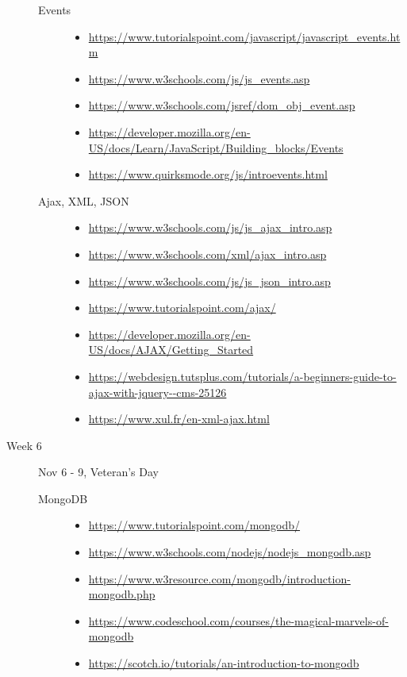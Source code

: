 \documentclass{article}
\begin{document}
\begin{description}
\begin{description}
\item[Events]\mbox{}
  \begin{itemize}
  \item\scriptsize\url{https://www.tutorialspoint.com/javascript/javascript_events.htm}
  \item\scriptsize\url{https://www.w3schools.com/js/js_events.asp}
  \item\scriptsize\url{https://www.w3schools.com/jsref/dom_obj_event.asp}
  \item\scriptsize\url{https://developer.mozilla.org/en-US/docs/Learn/JavaScript/Building_blocks/Events}
  \item\scriptsize\url{https://www.quirksmode.org/js/introevents.html}
  \end{itemize}    

\item[Ajax, XML, JSON]\mbox{}
  \begin{itemize}
  \item\scriptsize\url{https://www.w3schools.com/js/js_ajax_intro.asp}
  \item\scriptsize\url{https://www.w3schools.com/xml/ajax_intro.asp}
  \item\scriptsize\url{https://www.w3schools.com/js/js_json_intro.asp}
  \item\scriptsize\url{https://www.tutorialspoint.com/ajax/}
  \item\scriptsize\url{https://developer.mozilla.org/en-US/docs/AJAX/Getting_Started}
  \item\scriptsize\url{https://webdesign.tutsplus.com/tutorials/a-beginners-guide-to-ajax-with-jquery--cms-25126}
  \item\scriptsize\url{https://www.xul.fr/en-xml-ajax.html}
  \end{itemize}

  \end{description}
\item[Week 6]  Nov 6 - 9, Veteran's Day
  \begin{description}

\item[MongoDB]\mbox{}
  \begin{itemize}
  \item\scriptsize\url{https://www.tutorialspoint.com/mongodb/}
  \item\scriptsize\url{https://www.w3schools.com/nodejs/nodejs_mongodb.asp}
  \item\scriptsize\url{https://www.w3resource.com/mongodb/introduction-mongodb.php}
  \item\scriptsize\url{https://www.codeschool.com/courses/the-magical-marvels-of-mongodb}
  \item\scriptsize\url{https://scotch.io/tutorials/an-introduction-to-mongodb}
  \end{itemize}


\end{description}
\end{description}
\end{document}
